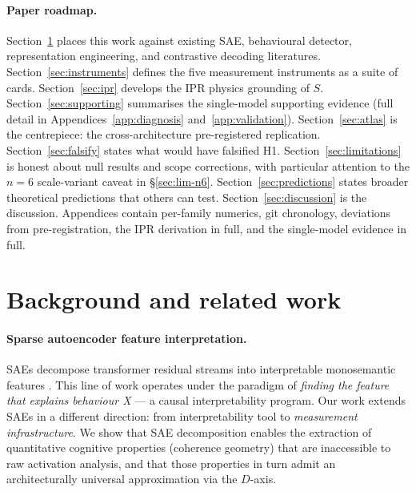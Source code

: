 \documentclass[11pt,letterpaper]{article}
\begin{document}
\paragraph{Paper roadmap.} Section~\ref{sec:related} places this work
against existing SAE, behavioural detector, representation engineering,
and contrastive decoding literatures. Section~\ref{sec:instruments}
defines the five measurement instruments as a suite of cards.
Section~\ref{sec:ipr} develops the IPR physics grounding of $S$.
Section~\ref{sec:supporting} summarises the single-model supporting
evidence (full detail in Appendices~\ref{app:diagnosis}
and~\ref{app:validation}). Section~\ref{sec:atlas} is the centrepiece:
the cross-architecture pre-registered replication.
Section~\ref{sec:falsify} states what would have falsified H1.
Section~\ref{sec:limitations} is honest about null results and scope
corrections, with particular attention to the $n\!=\!6$ scale-variant
caveat in \S\ref{sec:lim-n6}. Section~\ref{sec:predictions} states
broader theoretical predictions that others can test.
Section~\ref{sec:discussion} is the discussion. Appendices contain
per-family numerics, git chronology, deviations from pre-registration,
the IPR derivation in full, and the single-model evidence in full.

\section{Background and related work}
\label{sec:related}

\paragraph{Sparse autoencoder feature interpretation.} SAEs decompose
transformer residual streams into interpretable monosemantic features
\citep{cunningham2023sparse, bricken2023monosemanticity, templeton2024scaling}.
This line of work operates under the paradigm of \emph{finding the feature
that explains behaviour X} --- a causal interpretability program. Our work
extends SAEs in a different direction: from interpretability tool to
\emph{measurement infrastructure}. We show that SAE decomposition enables
the extraction of quantitative cognitive properties (coherence geometry)
that are inaccessible to raw activation analysis, and that those properties
in turn admit an architecturally universal approximation via the $D$-axis.
\end{document}
